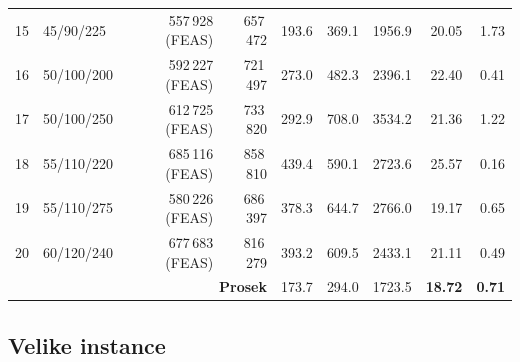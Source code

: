 \documentclass[12pt,a4paper]{article}
\begin{document}
\begin{longtable}{r l r r r r r r r}
15 & 45/90/225 & 557\,928 (FEAS) & 657\,472 & 193.6 & 369.1 & 1956.9 & 20.05 & 1.73 \\
16 & 50/100/200 & 592\,227 (FEAS) & 721\,497 & 273.0 & 482.3 & 2396.1 & 22.40 & 0.41 \\
17 & 50/100/250 & 612\,725 (FEAS) & 733\,820 & 292.9 & 708.0 & 3534.2 & 21.36 & 1.22 \\
18 & 55/110/220 & 685\,116 (FEAS) & 858\,810 & 439.4 & 590.1 & 2723.6 & 25.57 & 0.16 \\
19 & 55/110/275 & 580\,226 (FEAS) & 686\,397 & 378.3 & 644.7 & 2766.0 & 19.17 & 0.65 \\
20 & 60/120/240 & 677\,683 (FEAS) & 816\,279 & 393.2 & 609.5 & 2433.1 & 21.11 & 0.49 \\
\midrule
\multicolumn{4}{r}{\textbf{Prosek}} & 173.7 & 294.0 & 1723.5 & \textbf{18.72} & \textbf{0.71} \\
\end{longtable}

\subsection{Velike instance}
\end{document}
